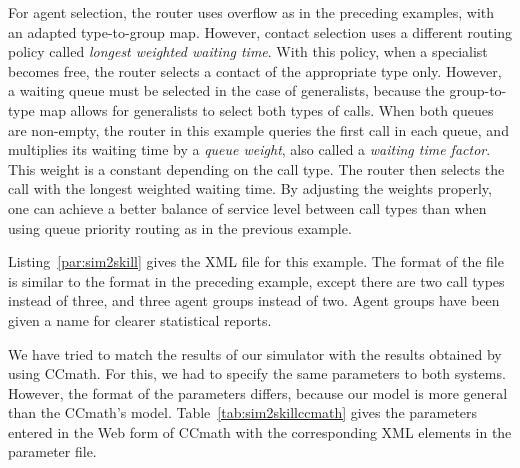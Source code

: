 For agent selection, the router uses overflow as in the preceding
examples, with an adapted type-to-group map.
However, contact selection uses a different routing policy called
\emph{longest weighted waiting time}.  With this policy,
when a specialist becomes free,
the router selects a contact of the appropriate type only.
However, a waiting queue must be selected in the case of generalists,
because the group-to-type map allows for generalists to select both
types of calls.  When both queues are non-empty, the router in this
example queries the first call in each queue, and
multiplies its waiting time by a \emph{queue weight}, also called a
\emph{waiting time factor}.  This weight is a constant depending on
the call type.  The router then selects the call with the
longest weighted waiting time.
By adjusting the weights properly, one can achieve a better balance of
service level between call types than when using queue priority
routing as in
the previous example.

Listing~\ref{par:sim2skill} gives the XML file for this example.  The
format of the file is similar to the format in the preceding example,
except there are two call types instead of three, and three agent
groups instead of two.  Agent groups have been given a name for
clearer statistical reports.



We have tried to match the results of our simulator with the results
obtained by using CCmath.  For this, we had to specify the same
parameters to both systems.  However, the format of the parameters
differs, because our model is more general than the CCmath's model.
Table~\ref{tab:sim2skillccmath} gives the parameters entered
in the Web form of CCmath with the corresponding XML elements in the
parameter file.

